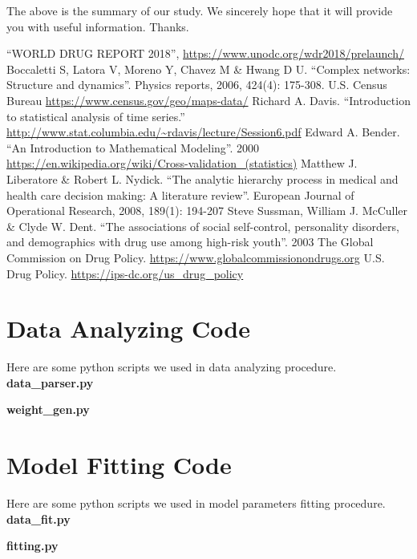 \documentclass{mcmthesis}
\begin{document}
The above is the summary of our study. We sincerely hope that it will provide you with
useful information. Thanks.

\newpage
\begin{thebibliography}{99}
	 ``WORLD DRUG REPORT 2018'', \url{https://www.unodc.org/wdr2018/prelaunch/}
	 Boccaletti S, Latora V, Moreno Y, Chavez M \& Hwang D U. ``Complex networks: Structure and dynamics''. Physics reports, 2006, 424(4): 175-308.
	 U.S. Census Bureau  \url{https://www.census.gov/geo/maps-data/}
	 Richard A. Davis. ``Introduction to statistical analysis of time series.'' \url{http://www.stat.columbia.edu/~rdavis/lecture/Session6.pdf}
	 Edward A. Bender. ``An Introduction to Mathematical Modeling''. 2000
	 \url{https://en.wikipedia.org/wiki/Cross-validation_(statistics)}
	 Matthew J. Liberatore \& Robert L. Nydick. ``The analytic hierarchy process in medical and health care decision making: A literature review''. European Journal of Operational Research, 2008, 189(1): 194-207
	 Steve Sussman, William J. McCuller \& Clyde W. Dent. ``The associations of social self-control, personality disorders, and demographics with drug use among high-risk youth''. 2003
	 The Global Commission on Drug Policy. \url{https://www.globalcommissionondrugs.org}
	 U.S. Drug Policy. \url{https://ips-dc.org/us_drug_policy}
\end{thebibliography}

\newpage

\begin{appendices}
	
	\section{Data Analyzing Code}
	
	Here are some python scripts we used in data analyzing procedure.\\
	
	\textbf{\textcolor[rgb]{0.98,0.00,0.00}{data\_parser.py}}
	

	
	\textbf{\textcolor[rgb]{0.98,0.00,0.00}{weight\_gen.py}}
		
	\section{Model Fitting Code}
	
	Here are some python scripts we used in model parameters fitting procedure.\\
	
	\textbf{\textcolor[rgb]{0.98,0.00,0.00}{data\_fit.py}}
	
	
	\textbf{\textcolor[rgb]{0.98,0.00,0.00}{fitting.py}}
	
	
	
\end{appendices}
	
	
\end{document}
